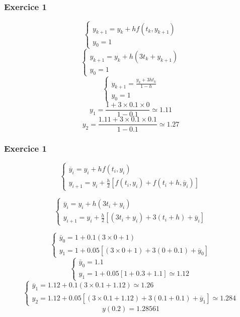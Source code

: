 \documentclass{beamer}
\begin{document}

\begin{frame}
\frametitle{Exercice 1}
 \[\left\{\begin{array}{l}
y_{k+1}=y_k+hf(t_k,y_{k+1})\\
y_0=1
\end{array}\right.\]
 \[\left\{\begin{array}{l}
y_{k+1}=y_k+h(3t_k+y_{k+1})\\
y_0=1
\end{array}\right.\]
\[\left\{\begin{array}{l}
y_{k+1}=\frac{y_k+3ht_k}{1-h}\\
y_0=1
\end{array}\right.\]
 \[y_1=\frac{1+3\times 0.1\times 0}{1-0.1}\simeq 1.11 \]
 \[y_2=\frac{1.11+3\times 0.1\times 0.1}{1-0.1}\simeq 1.27 \]
 \end{frame}
 
 
 \begin{frame}
\frametitle{Exercice 1}
 \[\left\{\begin{array}{l}
 \overline{y}_{i}=y_{i}+h f(t_{i},y_{i})\\
 y_{i+1}=y_{i}+\frac h2\left[f(t_{i},y_{i})+ f(t_{i}+h,\overline{y}_{i})\right]
\end{array}\right.\]

 \[\left\{\begin{array}{l}
 \overline{y}_{i}=y_{i}+h (3t_{i}+y_{i})\\
 y_{i+1}=y_{i}+\frac h2\left[(3t_{i}+y_{i})+ 3(t_{i}+h)+\overline{y}_{i}\right]
\end{array}\right.\]

 \[\left\{\begin{array}{l}
 \bar{y}_0=1+0.1(3\times 0+1)\\
 y_{1}=1+0.05\left[(3\times 0+1)+ 3(0+0.1)+\overline{y}_{0}\right]
\end{array}\right.\]
 \[\left\{\begin{array}{l}
 \bar{y}_0=1.1\\
 y_{1}=1+0.05\left[1+ 0.3+1.1\right]\simeq 1.12
\end{array}\right.\]
 \[\left\{\begin{array}{l}
 \overline{y}_{1}=1.12+0.1(3\times 0.1+1.12)\simeq 1.26\\
 y_{2}=1.12+0.05\left[(3\times 0.1+1.12)+ 3(0.1+0.1)+\overline{y}_{1}\right]\simeq 1.284
\end{array}\right.\]
\[y(0.2)=1.28561\]
 \end{frame}
 
\end{document}
